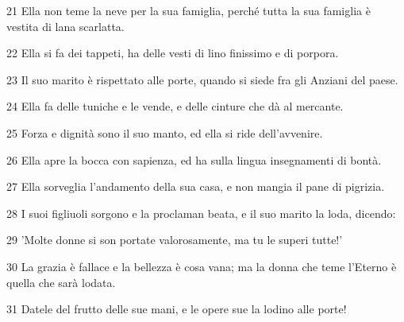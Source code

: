 \par 21 Ella non teme la neve per la sua famiglia, perché tutta la sua famiglia è vestita di lana scarlatta.
\par 22 Ella si fa dei tappeti, ha delle vesti di lino finissimo e di porpora.
\par 23 Il suo marito è rispettato alle porte, quando si siede fra gli Anziani del paese.
\par 24 Ella fa delle tuniche e le vende, e delle cinture che dà al mercante.
\par 25 Forza e dignità sono il suo manto, ed ella si ride dell'avvenire.
\par 26 Ella apre la bocca con sapienza, ed ha sulla lingua insegnamenti di bontà.
\par 27 Ella sorveglia l'andamento della sua casa, e non mangia il pane di pigrizia.
\par 28 I suoi figliuoli sorgono e la proclaman beata, e il suo marito la loda, dicendo:
\par 29 'Molte donne si son portate valorosamente, ma tu le superi tutte!'
\par 30 La grazia è fallace e la bellezza è cosa vana; ma la donna che teme l'Eterno è quella che sarà lodata.
\par 31 Datele del frutto delle sue mani, e le opere sue la lodino alle porte!


